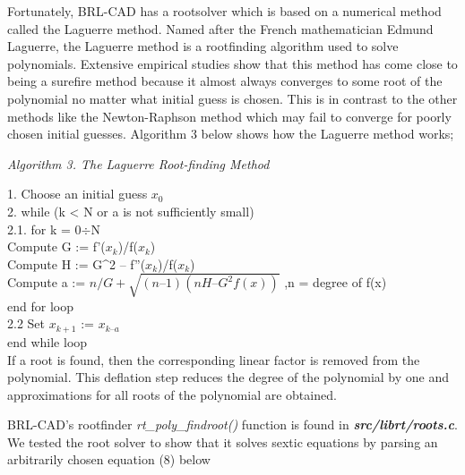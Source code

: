 Fortunately,   BRL-­CAD   has   a   root­solver   which   is   based   on   a   numerical  
method   called   the   Laguerre   method.   Named   after   the   French   mathematician  
Edmund   Laguerre,   the   Laguerre   method   is   a   root­finding   algorithm   used   to  
solve   polynomials.   Extensive   empirical   studies   show   that   this   method   has   come  
close   to   being   a   sure­fire   method   because   it   almost   always   converges   to   some  
root   of   the   polynomial   no   matter   what   initial   guess   is   chosen.   This   is   in   contrast  
to   the   other   methods   like   the   Newton­-Raphson   method   which   may   fail   to  
converge   for   poorly   chosen   initial   guesses.   Algorithm   3   below   shows   how   the  
Laguerre method works;  

\hspace{85} \textit{Algorithm 3. The Laguerre Root­-finding Method  }

1. Choose an initial guess $x_0$  \\
2. while (k < N or a is not sufficiently small) \\
\hspace{10}2.1. for k = 0$\div$N \\
\hspace{30}Compute  G := f'($x_k$)/f($x_k$) \\ 
\hspace{30}Compute  H := G^2 – f''($x_k$)/f($x_k$) \\ 
\hspace{30}Compute  a := $n/G + \sqrt{(n–1)(nH – G^2f(x))}$ ,n = degree of f(x) \\
\hspace{10}end for loop \\
\hspace{10}2.2 Set $x_{k+1}$ := $x_{k – a}$\\ 
end while loop \\

If   a   root   is   found,   then   the   corresponding   linear   factor   is   removed   from   the  
polynomial.   This   deflation   step   reduces   the   degree   of   the   polynomial   by   one  
and approximations for all roots of the polynomial are obtained. 
 
\hspace{30} BRL-­CAD's   root­finder   \textit{rt\_poly\_findroot()}   function   is   found   in  
\textit{\textbf{src/librt/roots.c}}.   We   tested   the   root   solver   to   show   that   it   solves   sextic  
equations by parsing an arbitrarily chosen equation (8) below  


